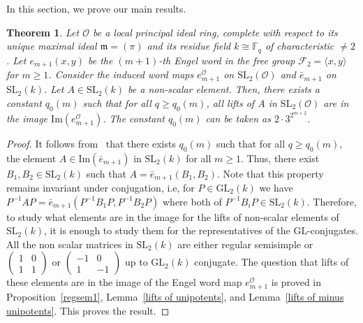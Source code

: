\documentclass[10pt,twoside]{amsart}
\newcommand{\GL}{\mathrm{GL}}
\newcommand{\SL}{\mathrm{SL}}
\newcommand{\im}{\mathrm{Im}}
\newtheorem{theorem}{Theorem}[section]
\theoremstyle{definition}
\theoremstyle{definition}
\begin{document}
In this section, we prove our main results.
\begin{theorem}{\label{th: Engel second}}
Let $\mathcal{O}$ be a local principal ideal ring, complete with respect to its unique maximal ideal $\mathfrak{m} = (\pi)$ and its residue field $k\cong \mathbb{F}_q$ of characteristic $\neq 2$. Let $e_{m+1}(x, y)$ be the $(m+1)$-th Engel word in the free group $\mathcal F_2=\langle x, y\rangle$ for $m\geq 1$. Consider the induced word maps $e_{m+1}^{\mathcal{O}}$ on $\SL_2(\mathcal{O})$ and $\bar e_{m+1}$ on $\SL_2(k)$.
Let $A\in \SL_2(k)$ be a non-scalar element. Then, there exists a constant $q_0(m)$ such that for all $q \geq q_0(m)$, all lifts of $A$ in $\SL_2(\mathcal{O})$ are in the image $\im (e_{m+1}^{\mathcal{O}})$. The constant $q_0(m)$ can be taken as $2\cdot3^{2^{m+2}}$.
\end{theorem}
\begin{proof}
It follows from~\cite[Corollary 3.9 and Corollary 5.4]{BandmanGarionGrunewald2012} that there exists $q_0(m)$ such that for all $q\geq q_0(m)$, the element $A \in \im(\bar e_{m+1})$ in $\SL_2(k) $ for all $m\geq 1$. Thus, there exist $B_1, B_2\in \SL_2(k)$ such that $A = \bar e_{m+1}(B_1, B_2)$. Note that this property remains invariant under conjugation, i.e, for $P\in \GL_2(k)$ we have $P^{-1}AP = \bar e_{m+1}(P^{-1}B_1P, P^{-1}B_2P)$ where both of $P^{-1}B_iP\in \SL_2(k)$. Therefore, to study what elements are in the image for the lifts of non-scalar elements of $\SL_2(k)$, it is enough to study them for the representatives of the $\GL$-conjugates. All the non scalar matrices in $\SL_2(k)$ are either regular semisimple or $\left(\begin{array}{cc}
1 & 0 \\ 1 & 1 \end{array}\right)$ or $\left(\begin{array}{cc}
-1 & 0 \\ 1 & -1 \end{array}\right)$ up to $\GL_2(k)$ conjugate. The question that lifts of these elements are in the image of the Engel word map $e_{m+1}^{\mathcal{O}}$ is proved in Proposition~\ref{regsem1}, Lemma~\ref{lifts of unipotents}, and Lemma~\ref{lifts of minus unipotents}. This proves the result. 
\end{proof}
\end{document}
